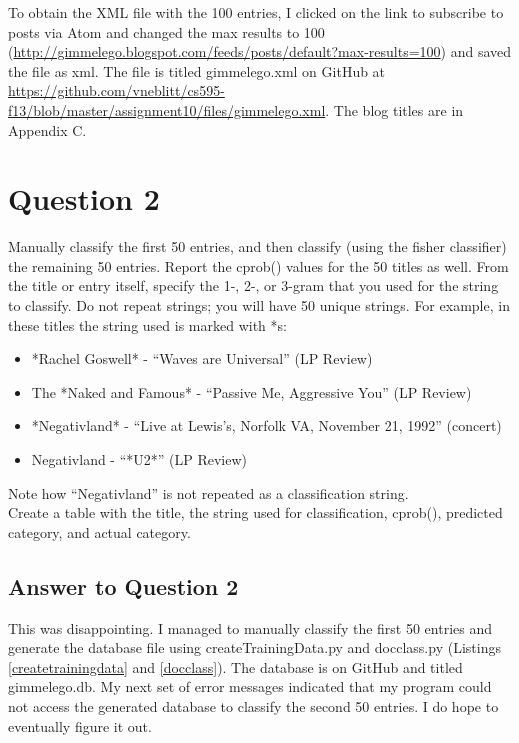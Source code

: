\documentclass{article}
\begin{document}
To obtain the XML file with the 100 entries, I clicked on the link to subscribe to posts via Atom and changed the max results to 100 (\url{http://gimmelego.blogspot.com/feeds/posts/default?max-results=100}) and saved the file as xml. The file is titled gimmelego.xml on GitHub at \url{https://github.com/vneblitt/cs595-f13/blob/master/assignment10/files/gimmelego.xml}. The blog titles are in Appendix C.




\newpage
\section*{Question 2}
Manually classify the first 50 entries, and then classify (using the fisher classifier) the remaining 50 entries. Report the cprob() values for the 50 titles as well. From the title or entry itself, specify the 1-, 2-, or 3-gram that you used for the string to classify. Do not repeat strings; you will have 50 unique strings. For example, in these titles the string used is marked with *s: \\

\begin{itemize}
\item *Rachel Goswell* - ``Waves are Universal'' (LP Review)
\item The *Naked and Famous* - ``Passive Me, Aggressive You'' (LP Review)
\item *Negativland* - ``Live at Lewis's, Norfolk VA, November 21, 1992'' (concert)
\item Negativland - ``*U2*'' (LP Review)
\end{itemize}

Note how 	``Negativland'' is not repeated as a classification string. \\

Create a table with the title, the string used for classification, cprob(), predicted category, and actual category.

\subsection*{Answer to Question 2}

This was disappointing. I managed to manually classify the first 50 entries and generate the database file using createTrainingData.py and docclass.py\cite{pci} (Listings \ref{createtrainingdata} and \ref{docclass}). The database is on GitHub and titled gimmelego.db. My next set of error messages indicated that my program could not access the generated database to classify the second 50 entries. I do hope to eventually figure it out.
\end{document}

